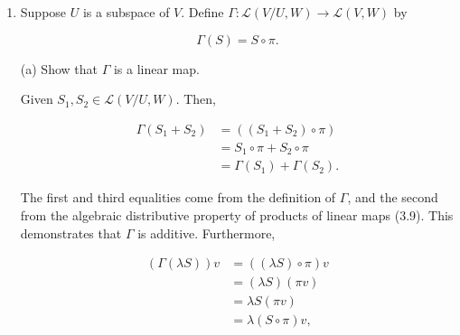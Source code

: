 \documentclass{book}
\begin{document}
\begin{enumerate}
The analogous statement is as follows: given sets \(S_1,\dots,S_m\), then the union \(S_1 \cap \dots \cap S_m\) is a disjoint union if and only if the cardinality of the union is the sum of the cardinalities of each set:

\begin{equation*}
    |S_1 \cap \dots \cap S_m| = |S_1| + \dots + |S_m|.
\end{equation*}

To prove this, assume that the union is disjoint, and so none of the \(S_i\) have any elements in common with the other \(S_i\).  Then, since each of the sets are finite, the (also finite) list of each of the elements of the sets will have no duplicates, and each element of each set will contribute \(1\) t the cardinality of \(S_1 \cap \dots \cap S_m\), meaning that \(|S_1 \cap \dots \cap S_m| = |S_1| + \dots + |S_m|\).  If the union is not disjoint, on the other hand, then the list of the elements of each set will have at least one duplicate, which won't be counted twice in the union, meaning that \(|S_1 \cap \dots \cap S_m| < |S_1| + \dots + |S_m|\).

\item Suppose \(U\) is a subspace of \(V\).  Define \(\Gamma: \mathcal{L}(V/U,W) \rightarrow \mathcal{L}(V,W)\) by

\begin{equation*}
    \Gamma(S)=S \circ \pi.
\end{equation*}

(a) Show that \(\Gamma\) is a linear map.

Given \(S_1,S_2 \in \mathcal{L}(V/U,W)\).  Then,

\begin{equation*}
    \begin{split}
        \Gamma(S_1+S_2) &= ((S_1+S_2) \circ \pi) \\
        &= S_1 \circ \pi + S_2 \circ \pi \\
        &= \Gamma(S_1)+\Gamma(S_2).
    \end{split}
\end{equation*}

The first and third equalities come from the definition of \(\Gamma\), and the second from the algebraic distributive property of products of linear maps (3.9).  This demonstrates that \(\Gamma\) is additive.  Furthermore,

\begin{equation*}
    \begin{split}
        (\Gamma(\lambda S))v &= ((\lambda S) \circ \pi)v \\
        &= (\lambda S)(\pi v) \\
        &= \lambda S(\pi v) \\
        &= \lambda (S \circ \pi)v,
    \end{split}
\end{equation*}


\end{enumerate}
\end{document}
